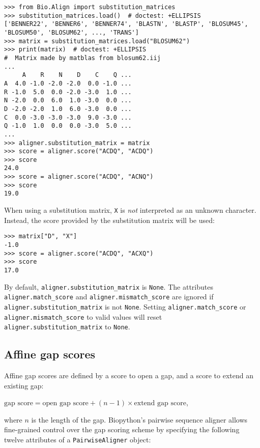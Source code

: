 \begin{itemize}
\begin{verbatim}
>>> from Bio.Align import substitution_matrices
>>> substitution_matrices.load()  # doctest: +ELLIPSIS
['BENNER22', 'BENNER6', 'BENNER74', 'BLASTN', 'BLASTP', 'BLOSUM45', 'BLOSUM50', 'BLOSUM62', ..., 'TRANS']
>>> matrix = substitution_matrices.load("BLOSUM62")
>>> print(matrix)  # doctest: +ELLIPSIS
#  Matrix made by matblas from blosum62.iij
...
     A    R    N    D    C    Q ...
A  4.0 -1.0 -2.0 -2.0  0.0 -1.0 ...
R -1.0  5.0  0.0 -2.0 -3.0  1.0 ...
N -2.0  0.0  6.0  1.0 -3.0  0.0 ...
D -2.0 -2.0  1.0  6.0 -3.0  0.0 ...
C  0.0 -3.0 -3.0 -3.0  9.0 -3.0 ...
Q -1.0  1.0  0.0  0.0 -3.0  5.0 ...
...
>>> aligner.substitution_matrix = matrix
>>> score = aligner.score("ACDQ", "ACDQ")
>>> score
24.0
>>> score = aligner.score("ACDQ", "ACNQ")
>>> score
19.0
\end{verbatim}
When using a substitution matrix, \verb+X+ is {\em not} interpreted as an unknown character. Instead, the score provided by the substitution matrix will be used:

\begin{verbatim}
>>> matrix["D", "X"]
-1.0
>>> score = aligner.score("ACDQ", "ACXQ")
>>> score
17.0
\end{verbatim}
\end{itemize}

By default, \verb+aligner.substitution_matrix+ is \verb+None+.
The attributes \verb+aligner.match_score+ and \verb+aligner.mismatch_score+ are
ignored if \verb+aligner.substitution_matrix+ is not \verb+None+.
Setting \verb+aligner.match_score+ or \verb+aligner.mismatch_score+ to valid values will reset \verb+aligner.substitution_matrix+ to \verb+None+.

\subsection{Affine gap scores}
\label{sec:pairwise-affine-gapscores}

Affine gap scores are defined by a score to open a gap, and a score to extend
an existing gap:

$\textrm{gap score} = \textrm{open gap score} + (n-1) \times \textrm{extend gap score}$,

where $n$ is the length of the gap.
Biopython's pairwise sequence aligner allows fine-grained control over the gap
scoring scheme by specifying the following twelve attributes of a \verb+PairwiseAligner+ object:

